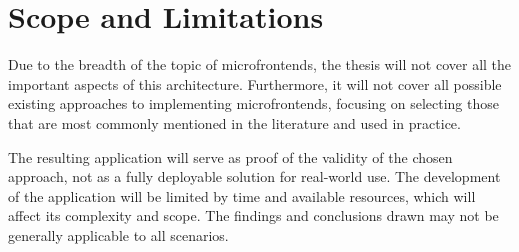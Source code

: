 \section{Scope and Limitations}
Due to the breadth of the topic of microfrontends, the thesis will not cover all the important aspects of this architecture. Furthermore, it will not cover all possible existing approaches to implementing microfrontends, focusing on selecting those that are most commonly mentioned in the literature and used in practice.

The resulting application will serve as proof of the validity of the chosen approach, not as a fully deployable solution for real-world use. The development of the application will be limited by time and available resources, which will affect its complexity and scope. The findings and conclusions drawn may not be generally applicable to all scenarios.